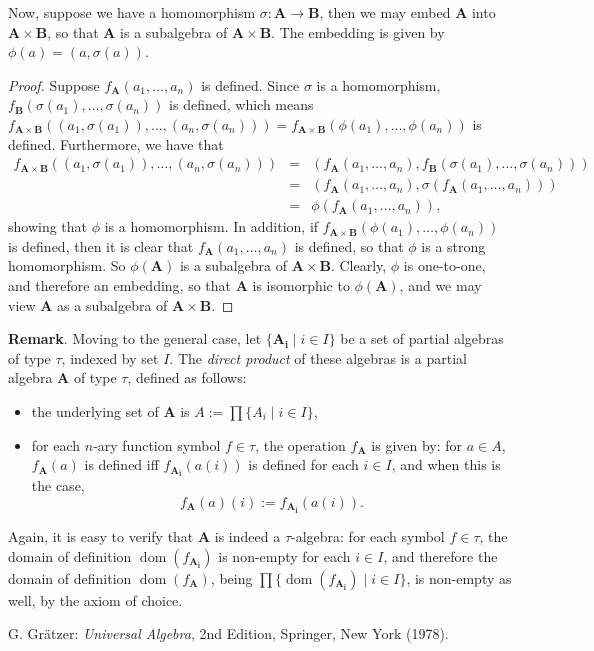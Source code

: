 \documentclass[12pt]{article}
\begin{document}
Now, suppose we have a homomorphism $\sigma:\boldsymbol{A}\to \boldsymbol{B}$, then we may embed $\boldsymbol{A}$ into $\boldsymbol{A}\times \boldsymbol{B}$, so that $\boldsymbol{A}$ is a subalgebra of $\boldsymbol{A}\times \boldsymbol{B}$.  The embedding is given by $\phi(a)=(a,\sigma(a))$.

\begin{proof}  Suppose $f_{\boldsymbol{A}}(a_1,\ldots, a_n)$ is defined.  Since $\sigma$ is a homomorphism, $f_{\boldsymbol{B}}(\sigma(a_1),\ldots, \sigma(a_n))$ is defined, which means $f_{\boldsymbol{A}\times \boldsymbol{B}}((a_1,\sigma(a_1)), \ldots, (a_n,\sigma(a_n)))= f_{\boldsymbol{A}\times \boldsymbol{B}}(\phi(a_1), \ldots, \phi(a_n))$ is defined.  Furthermore, we have that 
\begin{eqnarray*}
f_{\boldsymbol{A}\times \boldsymbol{B}}((a_1,\sigma(a_1)), \ldots, (a_n,\sigma(a_n))) &=& 
(f_{\boldsymbol{A}}(a_1,\ldots, a_n),f_{\boldsymbol{B}}(\sigma(a_1),\ldots, \sigma(a_n))) \\ &=& (f_{\boldsymbol{A}}(a_1,\ldots, a_n),\sigma(f_{\boldsymbol{A}}(a_1, \ldots, a_n))) \\ &=& \phi(f_{\boldsymbol{A}}(a_1,\ldots, a_n)),
\end{eqnarray*}
showing that $\phi$ is a homomorphism.  In addition, if $f_{\boldsymbol{A}\times \boldsymbol{B}}(\phi(a_1), \ldots, \phi(a_n))$ is defined, then it is clear that $f_{\boldsymbol{A}}(a_1, \ldots, a_n)$ is defined, so that $\phi$ is a strong homomorphism.  So $\phi(\boldsymbol{A})$ is a subalgebra of $\boldsymbol{A}\times \boldsymbol{B}$.  Clearly, $\phi$ is one-to-one, and therefore an embedding, so that $\boldsymbol{A}$ is isomorphic to $\phi(\boldsymbol{A})$, and we may view $\boldsymbol{A}$ as a subalgebra of $\boldsymbol{A}\times \boldsymbol{B}$.
\end{proof}

\textbf{Remark}.  Moving to the general case, let $\lbrace \boldsymbol{A_i} \mid i\in I\rbrace$ be a set of partial algebras of type $\tau$, indexed by set $I$.  The \emph{direct product} of these algebras is a partial algebra $\boldsymbol{A}$ of type $\tau$, defined as follows:
\begin{itemize}
\item the underlying set of $\boldsymbol{A}$ is $A:= \prod \lbrace A_i\mid i\in I\rbrace$,
\item for each $n$-ary function symbol $f\in \tau$, the operation $f_{\boldsymbol{A}}$ is given by: for $a \in A$, $f_{\boldsymbol{A}}(a)$ is defined iff $f_{\boldsymbol{A_i}}(a(i))$ is defined for each $i\in I$, and when this is the case,
$$f_{\boldsymbol{A}}(a)(i):= f_{\boldsymbol{A_i}}(a(i)).$$
\end{itemize}
Again, it is easy to verify that $\boldsymbol{A}$ is indeed a $\tau$-algebra: for each symbol $f\in \tau$, the domain of definition $\operatorname{dom}(f_{\boldsymbol{A_i}})$ is non-empty for each $i\in I$, and therefore the domain of definition $\operatorname{dom}(f_{\boldsymbol{A}})$, being $\prod \lbrace \operatorname{dom}(f_{\boldsymbol{A_i}}) \mid i\in I \rbrace$, is non-empty as well, by the axiom of choice.

\begin{thebibliography}{7}
 G. Gr\"{a}tzer: {\em Universal Algebra}, 2nd Edition, Springer, New York (1978).
\end{thebibliography}
\end{document}

